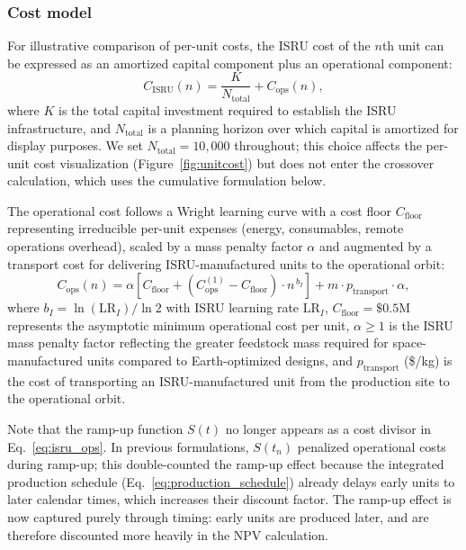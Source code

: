 \documentclass[preprint,12pt]{elsarticle}
\begin{document}
\subsubsection{Cost model}

For illustrative comparison of per-unit costs, the ISRU cost of the $n$th unit can be expressed as an amortized capital component plus an operational component:
\begin{equation}
  C_{\mathrm{ISRU}}(n) = \frac{K}{N_{\mathrm{total}}} + C_{\mathrm{ops}}(n),
  \label{eq:isru_unit}
\end{equation}
where $K$ is the total capital investment required to establish the ISRU infrastructure, and $N_{\mathrm{total}}$ is a planning horizon over which capital is amortized for display purposes. We set $N_{\mathrm{total}} = 10{,}000$ throughout; this choice affects the per-unit cost visualization (Figure~\ref{fig:unitcost}) but does not enter the crossover calculation, which uses the cumulative formulation below.

The operational cost follows a Wright learning curve with a cost floor $C_{\mathrm{floor}}$ representing irreducible per-unit expenses (energy, consumables, remote operations overhead), scaled by a mass penalty factor $\alpha$ and augmented by a transport cost for delivering ISRU-manufactured units to the operational orbit:
\begin{equation}
  C_{\mathrm{ops}}(n) = \alpha \left[ C_{\mathrm{floor}} + \left(C_{\mathrm{ops}}^{(1)} - C_{\mathrm{floor}}\right) \cdot n^{\,b_I} \right] + m \cdot p_{\mathrm{transport}} \cdot \alpha,
  \label{eq:isru_ops}
\end{equation}
where $b_I = \ln(\mathrm{LR}_I)/\ln 2$ with ISRU learning rate $\mathrm{LR}_I$, $C_{\mathrm{floor}} = \$0.5$M represents the asymptotic minimum operational cost per unit, $\alpha \geq 1$ is the ISRU mass penalty factor reflecting the greater feedstock mass required for space-manufactured units compared to Earth-optimized designs, and $p_{\mathrm{transport}}$ (\$/kg) is the cost of transporting an ISRU-manufactured unit from the production site to the operational orbit.

Note that the ramp-up function $S(t)$ no longer appears as a cost divisor in Eq.~\ref{eq:isru_ops}. In previous formulations, $S(t_n)$ penalized operational costs during ramp-up; this double-counted the ramp-up effect because the integrated production schedule (Eq.~\ref{eq:production_schedule}) already delays early units to later calendar times, which increases their discount factor. The ramp-up effect is now captured purely through timing: early units are produced later, and are therefore discounted more heavily in the NPV calculation.
\end{document}

